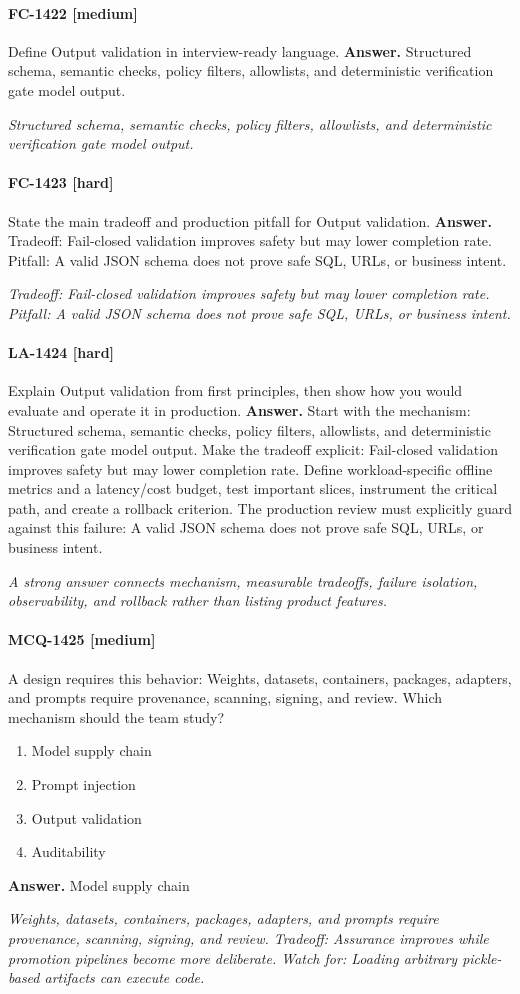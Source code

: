 \paragraph{FC-1422 [medium]} Define Output validation in interview-ready language.
\noindent\textbf{Answer.} Structured schema, semantic checks, policy filters, allowlists, and deterministic verification gate model output.
\par\textit{Structured schema, semantic checks, policy filters, allowlists, and deterministic verification gate model output.}
\paragraph{FC-1423 [hard]} State the main tradeoff and production pitfall for Output validation.
\noindent\textbf{Answer.} Tradeoff: Fail-closed validation improves safety but may lower completion rate. Pitfall: A valid JSON schema does not prove safe SQL, URLs, or business intent.
\par\textit{Tradeoff: Fail-closed validation improves safety but may lower completion rate. Pitfall: A valid JSON schema does not prove safe SQL, URLs, or business intent.}
\paragraph{LA-1424 [hard]} Explain Output validation from first principles, then show how you would evaluate and operate it in production.
\noindent\textbf{Answer.} Start with the mechanism: Structured schema, semantic checks, policy filters, allowlists, and deterministic verification gate model output. Make the tradeoff explicit: Fail-closed validation improves safety but may lower completion rate. Define workload-specific offline metrics and a latency/cost budget, test important slices, instrument the critical path, and create a rollback criterion. The production review must explicitly guard against this failure: A valid JSON schema does not prove safe SQL, URLs, or business intent.
\par\textit{A strong answer connects mechanism, measurable tradeoffs, failure isolation, observability, and rollback rather than listing product features.}
\paragraph{MCQ-1425 [medium]} A design requires this behavior: Weights, datasets, containers, packages, adapters, and prompts require provenance, scanning, signing, and review. Which mechanism should the team study?
\begin{enumerate}[label=\Alph*.]
\item Model supply chain
\item Prompt injection
\item Output validation
\item Auditability
\end{enumerate}
\noindent\textbf{Answer.} Model supply chain
\par\textit{Weights, datasets, containers, packages, adapters, and prompts require provenance, scanning, signing, and review. Tradeoff: Assurance improves while promotion pipelines become more deliberate. Watch for: Loading arbitrary pickle-based artifacts can execute code.}
